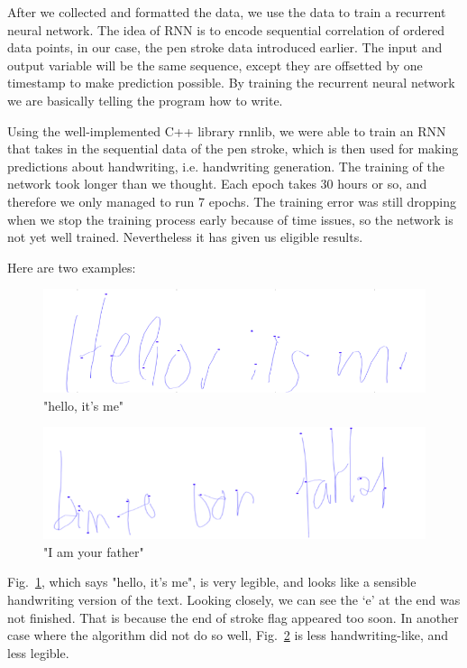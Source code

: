 \documentclass{article} %
\newcommand{\fref}[1]{Fig.~\ref{fig:#1}}
\newcommand{\flabel}[1]{\label{fig:#1}}
\begin{document}
After we collected and formatted the data, we use the data to train a recurrent neural network. The idea of RNN is to encode sequential correlation of ordered data points, in our case, the pen stroke data introduced earlier. The input and output variable will be the same sequence, except they are offsetted by one timestamp to make prediction possible. By training the recurrent neural network we are basically telling the program how to write. 

Using the well-implemented C++ library rnnlib, we were able to train an RNN that takes in the sequential data of the pen stroke, which is then used for making predictions about handwriting, i.e. handwriting generation. The training of the network took longer than we thought. Each epoch takes 30 hours or so, and therefore we only managed to run 7 epochs. The training error was still dropping when we stop the training process early because of time issues, so the network is not yet well trained. Nevertheless it has given us eligible results. 


Here are two examples: 
\begin{figure}[h]
\begin{center}
\includegraphics[scale = 0.5]{hello.png}
\end{center}
\flabel{hello}
\caption{"hello, it's me"}
\end{figure}

\begin{figure}[h]
\begin{center}
\includegraphics[scale = 0.5]{father.png}
\end{center}
\flabel{father}
\caption{"I am your father"}
\end{figure}

\fref{hello}, which says "hello, it's me", is very legible, and looks like a sensible handwriting version of the text. Looking closely, we can see the ‘e’ at the end was not finished. That is because the end of stroke flag appeared too soon. In another case where the algorithm did not do so well, \fref{father} is less handwriting-like, and less legible.  
\end{document}
